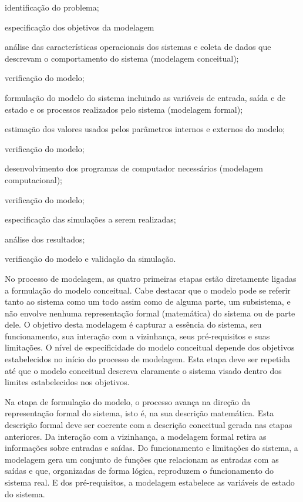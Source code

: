 \documentclass[a4paper,12pt,oneside,onecolumn]{uerj/uerj}
\begin{document}
\begin{lcircp}
    \item identificação do problema;
    \item especificação dos objetivos da modelagem
    \item análise das características operacionais dos sistemas e coleta de dados que descrevam o comportamento do sistema (modelagem conceitual);
    \item verificação do modelo;
    \item formulação do modelo do sistema incluindo as variáveis de entrada, saída e de estado e os processos realizados pelo sistema (modelagem formal);
    \item estimação dos valores usados pelos parâmetros internos e externos do modelo;
    \item verificação do modelo;
    \item desenvolvimento dos programas de computador necessários (modelagem computacional);
    \item verificação do modelo;
    \item especificação das simulações a serem realizadas;
    \item análise dos resultados;
    \item verificação do modelo e validação da simulação.\\
\end{lcircp}

No processo de modelagem, as quatro primeiras etapas estão diretamente ligadas a formulação do modelo conceitual. Cabe destacar que o modelo pode se referir tanto ao sistema como um todo assim como de alguma parte, um subsistema, e não envolve nenhuma representação formal (matemática) do sistema ou de parte dele. O objetivo desta modelagem é capturar a essência do sistema, seu funcionamento, sua interação com a vizinhança, seus pré-requisitos e suas limitações. O nível de especificidade do modelo conceitual depende dos objetivos estabelecidos no início do processo de modelagem. Esta etapa deve ser repetida até que o modelo conceitual descreva claramente o sistema visado dentro dos limites estabelecidos nos objetivos.

Na etapa de formulação do modelo, o processo avança na direção da representação formal do sistema, isto é, na sua descrição matemática. Esta descrição formal deve ser coerente com a descrição conceitual gerada nas etapas anteriores. Da interação com a vizinhança, a modelagem formal retira as informações sobre entradas e saídas. Do funcionamento e limitações do sistema, a modelagem gera um conjunto de funções que relacionam as entradas com as saídas e que, organizadas de forma lógica, reproduzem o funcionamento do sistema real. E dos pré-requisitos, a modelagem estabelece as variáveis de estado do sistema.
\end{document}
